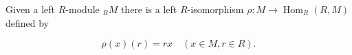 Given a left $R$-module $_R M$ there is a left $R$-isomorphism $\rho: M \rightarrow \operatorname{Hom}_R(R, M)$ defined by

$$\rho(x)(r) = rx \quad (x \in M, r \in R).$$
